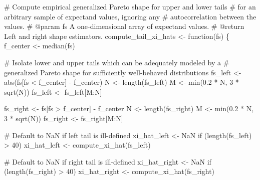 \documentclass[
  letterpaper,
  DIV=11,
  numbers=noendperiod]{scrartcl}
\newenvironment{Shaded}{\begin{snugshade}}{\end{snugshade}}
\newcommand{\CommentTok}[1]{\textcolor[rgb]{0.37,0.37,0.37}{#1}}
\newcommand{\ConstantTok}[1]{\textcolor[rgb]{0.56,0.35,0.01}{#1}}
\newcommand{\ControlFlowTok}[1]{\textcolor[rgb]{0.00,0.23,0.31}{#1}}
\newcommand{\DecValTok}[1]{\textcolor[rgb]{0.68,0.00,0.00}{#1}}
\newcommand{\FloatTok}[1]{\textcolor[rgb]{0.68,0.00,0.00}{#1}}
\newcommand{\FunctionTok}[1]{\textcolor[rgb]{0.28,0.35,0.67}{#1}}
\newcommand{\NormalTok}[1]{\textcolor[rgb]{0.00,0.23,0.31}{#1}}
\newcommand{\OtherTok}[1]{\textcolor[rgb]{0.00,0.23,0.31}{#1}}
\newcommand{\SpecialCharTok}[1]{\textcolor[rgb]{0.37,0.37,0.37}{#1}}
\begin{document}
\begin{Shaded}
\begin{Highlighting}[]
\CommentTok{\# Compute empirical generalized Pareto shape for upper and lower tails}
\CommentTok{\# for an arbitrary sample of expectand values, ignoring any }
\CommentTok{\# autocorrelation between the values.}
\CommentTok{\# @param fs A one{-}dimensional array of expectand values.}
\CommentTok{\# @return Left and right shape estimators.}
\NormalTok{compute\_tail\_xi\_hats }\OtherTok{\textless{}{-}} \ControlFlowTok{function}\NormalTok{(fs) \{}
\NormalTok{  f\_center }\OtherTok{\textless{}{-}} \FunctionTok{median}\NormalTok{(fs)}
  
  \CommentTok{\# Isolate lower and upper tails which can be adequately modeled by a }
  \CommentTok{\# generalized Pareto shape for sufficiently well{-}behaved distributions}
\NormalTok{  fs\_left }\OtherTok{\textless{}{-}} \FunctionTok{abs}\NormalTok{(fs[fs }\SpecialCharTok{\textless{}}\NormalTok{ f\_center] }\SpecialCharTok{{-}}\NormalTok{ f\_center)}
\NormalTok{  N }\OtherTok{\textless{}{-}} \FunctionTok{length}\NormalTok{(fs\_left)}
\NormalTok{  M }\OtherTok{\textless{}{-}} \FunctionTok{min}\NormalTok{(}\FloatTok{0.2} \SpecialCharTok{*}\NormalTok{ N, }\DecValTok{3} \SpecialCharTok{*} \FunctionTok{sqrt}\NormalTok{(N))}
\NormalTok{  fs\_left }\OtherTok{\textless{}{-}}\NormalTok{ fs\_left[M}\SpecialCharTok{:}\NormalTok{N]}
  
\NormalTok{  fs\_right }\OtherTok{\textless{}{-}}\NormalTok{ fs[fs }\SpecialCharTok{\textgreater{}}\NormalTok{ f\_center] }\SpecialCharTok{{-}}\NormalTok{ f\_center}
\NormalTok{  N }\OtherTok{\textless{}{-}} \FunctionTok{length}\NormalTok{(fs\_right)}
\NormalTok{  M }\OtherTok{\textless{}{-}} \FunctionTok{min}\NormalTok{(}\FloatTok{0.2} \SpecialCharTok{*}\NormalTok{ N, }\DecValTok{3} \SpecialCharTok{*} \FunctionTok{sqrt}\NormalTok{(N))}
\NormalTok{  fs\_right }\OtherTok{\textless{}{-}}\NormalTok{ fs\_right[M}\SpecialCharTok{:}\NormalTok{N]}
  
  \CommentTok{\# Default to NaN if left tail is ill{-}defined}
\NormalTok{  xi\_hat\_left }\OtherTok{\textless{}{-}} \ConstantTok{NaN}
  \ControlFlowTok{if}\NormalTok{ (}\FunctionTok{length}\NormalTok{(fs\_left) }\SpecialCharTok{\textgreater{}} \DecValTok{40}\NormalTok{)}
\NormalTok{    xi\_hat\_left }\OtherTok{\textless{}{-}} \FunctionTok{compute\_xi\_hat}\NormalTok{(fs\_left)}

  \CommentTok{\# Default to NaN if right tail is ill{-}defined}
\NormalTok{  xi\_hat\_right }\OtherTok{\textless{}{-}} \ConstantTok{NaN}
  \ControlFlowTok{if}\NormalTok{ (}\FunctionTok{length}\NormalTok{(fs\_right) }\SpecialCharTok{\textgreater{}} \DecValTok{40}\NormalTok{)}
\NormalTok{    xi\_hat\_right }\OtherTok{\textless{}{-}} \FunctionTok{compute\_xi\_hat}\NormalTok{(fs\_right)}


\end{Highlighting}
\end{Shaded}
\end{document}
